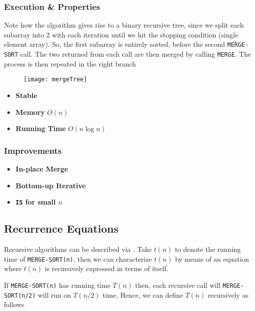 \subsubsection{Execution \& Properties}


\par{Note how the algorithm gives rise to a binary recursive tree, since we
split each subarray into 2 with each iteration until we hit the stopping
condition (single element array). So, the first subarray is entirely sorted,
before the second \texttt{MERGE-SORT} call. The two  returned
from each call are then merged by calling \texttt{MERGE}. The process is then
repeated in the right branch}

\begin{figure}[H]
	\texttt{[image: mergeTree]}
\end{figure}

\begin{itemize}
	\item\textbf{Stable}
	\item\textbf{Memory} $O(n)$
	\item\textbf{Running Time} $O(n \log n)$
\end{itemize}

\subsubsection{Improvements}

	\begin{itemize}
			\item[]\textbf{In-place Merge}
			\item[]\textbf{Bottom-up Iterative}
			\item[]\textbf{\texttt{IS} for small $n$}
	\end{itemize}
\subsection{Recurrence Equations}


	

\par{Recursive algorithms can be described via . Take
$t(n)$ to denote the  running time of \texttt{MERGE-SORT(n)},
then we can characterize $t(n)$ by means of an equation where $t(n)$ is
recursively expressed in terms of itself.
}
\par{If \texttt{MERGE-SORT(n)} has running time $T(n)$ then, each recursive call
will \texttt{MERGE-SORT(n/2)} will run on $T(n/2)$ time. Hence, we can define
$T(n)$ recursively as follows}

